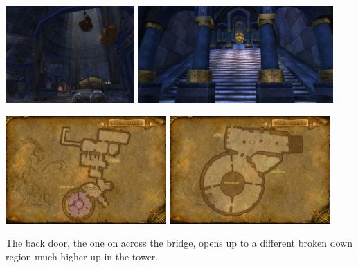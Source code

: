 \begin{center}
	\includegraphics[width=0.37\textwidth]{img/Karazhan/21972-karazhan-the-livery-stables-this-is-where-you-fight-attumen-the-huntsman.jpg} \includegraphics[width=0.56\textwidth]{img/Karazhan/karazhansteps.jpg}
	
	\includegraphics[width=0.46\textwidth]{img/Karazhan/cropped-3457-1.jpg} \includegraphics[width=0.46\textwidth]{img/Karazhan/cropped-3457-2.jpg}
\end{center}

The back door, the one on across the bridge, opens up to a different broken down region much higher up in the tower.


